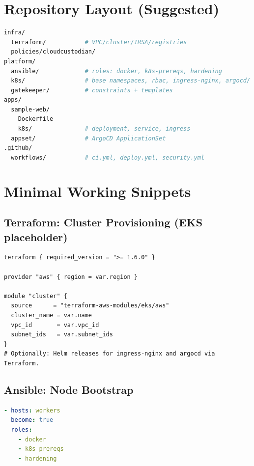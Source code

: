 \documentclass[11pt]{article}
\begin{document}
\section{Repository Layout (Suggested)}
\begin{lstlisting}[style=code,language=bash,caption={Top-level repository structure}]
infra/
  terraform/           # VPC/cluster/IRSA/registries
  policies/cloudcustodian/
platform/
  ansible/             # roles: docker, k8s-prereqs, hardening
  k8s/                 # base namespaces, rbac, ingress-nginx, argocd/
  gatekeeper/          # constraints + templates
apps/
  sample-web/
    Dockerfile
    k8s/               # deployment, service, ingress
  appset/              # ArgoCD ApplicationSet
.github/
  workflows/           # ci.yml, deploy.yml, security.yml
\end{lstlisting}

\section{Minimal Working Snippets}

\subsection{Terraform: Cluster Provisioning (EKS placeholder)}
\begin{lstlisting}[style=code,language=hcl,caption={infra/terraform/main.tf}]
terraform { required_version = ">= 1.6.0" }

provider "aws" { region = var.region }

module "cluster" {
  source      = "terraform-aws-modules/eks/aws"
  cluster_name = var.name
  vpc_id       = var.vpc_id
  subnet_ids   = var.subnet_ids
}
# Optionally: Helm releases for ingress-nginx and argocd via Terraform.
\end{lstlisting}

\subsection{Ansible: Node Bootstrap}
\begin{lstlisting}[style=code,language=yaml,caption={platform/ansible/playbooks/bootstrap.yaml}]
- hosts: workers
  become: true
  roles:
    - docker
    - k8s_prereqs
    - hardening
\end{lstlisting}
\end{document}
